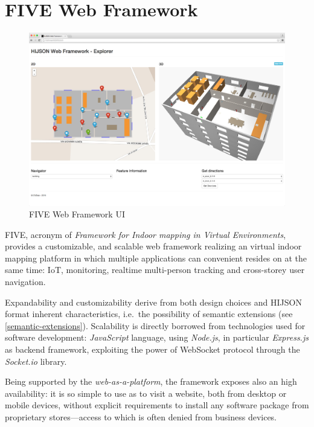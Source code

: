 \section{FIVE Web Framework}\label{framework}

\begin{figure}[htb]
\centering
\includegraphics[width=\textwidth]{images/web_framework_2.png}
\caption{FIVE Web Framework UI}
\label{fig:web-framework-ui}
\end{figure}

FIVE, acronym of \emph{Framework for Indoor mapping in Virtual Environments},
provides a customizable, and scalable web framework realizing an virtual
indoor mapping platform in which multiple applications can convenient resides
on at the same time: IoT,  monitoring, realtime multi-person tracking and
cross-storey user navigation.

Expandability and customizability derive from both design choices and
HIJSON format inherent characteristics, i.e.~the possibility of semantic extensions (see \ref{semantic-extensions}).
Scalability is directly borrowed from technologies used for
software development: \emph{JavaScript} language, using \emph{Node.js},
in particular \emph{Express.js} as backend framework, exploiting the
power of WebSocket protocol through the \emph{Socket.io} library.

Being supported by the \emph{web-as-a-platform}, the framework exposes
also an high availability: it is so simple to use as to visit a
website, both from desktop or mobile devices, without explicit
requirements to install any software package from proprietary stores---access to
which is often denied from business devices.

